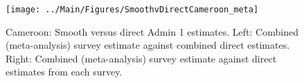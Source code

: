\documentclass[12pt]{article}\usepackage[]{graphicx}\usepackage[]{color}
\newenvironment{knitrout}{}{} %
\begin{document}

\begin{knitrout}
\color{fgcolor}\begin{figure}[bht]

{\centering \texttt{[image: ../Main/Figures/SmoothvDirectCameroon\_meta]} 

}

\caption[Cameroon]{Cameroon: Smooth versus direct Admin 1 estimates. Left: Combined (meta-analysis) survey estimate against combined direct estimates. Right: Combined (meta-analysis) survey estimate against direct estimates from each survey.}\label{fig:unnamed-chunk-43}
\end{figure}


\end{knitrout}
\end{document}
